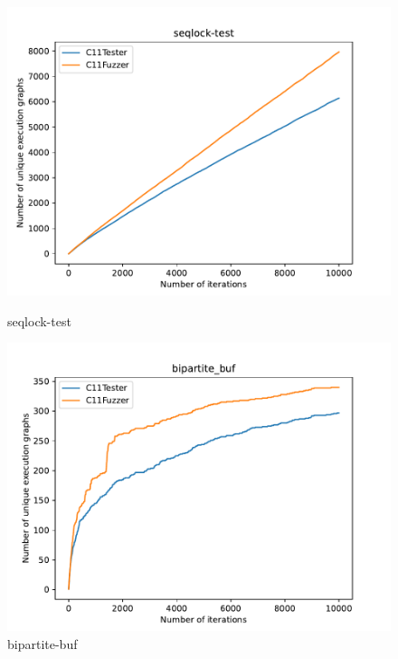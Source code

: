 \begin{figure}[H]
	\begin{minipage}{0.45\textwidth}
		\centering
		\includegraphics[width=\textwidth]{figure/seqlock-test.pdf}
		\caption{seqlock-test}
		\label{cover-plot1-seqlock-test}
	\end{minipage}
	\hfill
	\begin{minipage}{0.45\textwidth}
		\centering
		\includegraphics[width=\textwidth]{figure/bipartite_buf.pdf}
		\caption{bipartite-buf}
		\label{cover-plot1-bipartite-buf}
	\end{minipage}

	\vspace{0.5cm}


\end{figure}
